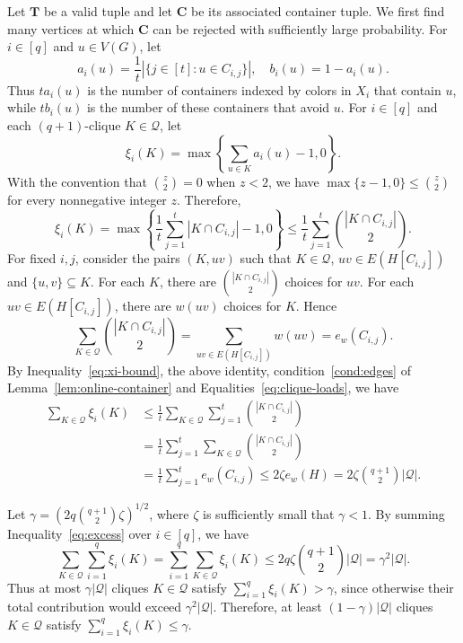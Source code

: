 \documentclass[12pt]{article}
\numberwithin{equation}{section}
\theoremstyle{definition}
\begin{document}
Let $\mathbf{T}$ be a valid tuple and let $\mathbf{C}$ be its associated
container tuple. We first find many vertices at which $\mathbf{C}$ can be
rejected with sufficiently large probability. For $i \in [q]$ and
$u \in V(G)$, let
\[
 a_i(u) = \frac{1}{t}|\{j \in [t] : u \in C_{i,j}\}|,
 \quad b_i(u) = 1 - a_i(u).
\]
Thus $ta_i(u)$ is the number of containers indexed by colors in $X_i$ that
contain $u$, while $tb_i(u)$ is the number of these containers that avoid $u$.
For $i\in[q]$ and each $(q+1)$-clique $K\in\mathcal Q$, let
\[
 \xi_i(K) = \max\left\{\sum_{u \in K} a_i(u) - 1,0\right\}.
\]
With the convention that $\binom{z}{2}=0$ when $z<2$, we have
$\max\{z-1,0\}\leq\binom{z}{2}$ for every nonnegative integer $z$. Therefore,
\begin{equation}\label{eq:xi-bound}
 \xi_i(K)
 = \max\left\{\frac{1}{t}\sum_{j = 1}^t |K \cap C_{i,j}| - 1,0\right\}
 \leq \frac{1}{t}\sum_{j = 1}^t \binom{|K \cap C_{i,j}|}{2}.
\end{equation}
For fixed $i,j$, consider the pairs $(K,uv)$ such that
$K \in \mathcal Q$, $uv \in E(H[C_{i,j}])$ and $\{u,v\} \subseteq K$.
For each $K$, there are $\binom{|K \cap C_{i,j}|}{2}$ choices for $uv$.
For each $uv \in E(H[C_{i,j}])$, there are $w(uv)$ choices for $K$. Hence
\[
\sum_{K\in\mathcal Q}\binom{|K\cap C_{i,j}|}{2}
=\sum_{uv\in E(H[C_{i,j}])}w(uv)
=e_w(C_{i,j}).
\] 
By Inequality~\eqref{eq:xi-bound}, the above identity,
condition~\ref{cond:edges} of Lemma~\ref{lem:online-container} and
Equalities~\eqref{eq:clique-loads}, we have
\begin{equation}\label{eq:excess}
 \begin{aligned}
 \sum_{K \in \mathcal Q} \xi_i(K)
 & \leq \frac{1}{t}\sum_{K \in \mathcal Q} \sum_{j = 1}^t
       \binom{|K \cap C_{i,j}|}{2}\\
 &= \frac{1}{t}\sum_{j = 1}^t \sum_{K \in \mathcal Q}
       \binom{|K \cap C_{i,j}|}{2}\\
 &= \frac{1}{t}\sum_{j = 1}^t e_w(C_{i,j})
 \leq 2\zeta e_w(H)
 = 2\zeta\binom{q + 1}{2}|\mathcal Q|.
 \end{aligned}
\end{equation}
 
Let $\gamma = (2q\binom{q + 1}{2}\zeta)^{1/2}$, where $\zeta$ is
sufficiently small that $\gamma < 1$. By summing Inequality~\eqref{eq:excess} over $i\in[q]$, we have
\[
\sum_{K\in\mathcal Q}\sum_{i=1}^q\xi_i(K)
=\sum_{i=1}^q\sum_{K\in\mathcal Q}\xi_i(K)
\leq 2q\zeta\binom{q+1}{2}|\mathcal Q|
=\gamma^2|\mathcal Q|.
\]
Thus at most $\gamma|\mathcal Q|$ cliques $K\in\mathcal Q$ satisfy
$\sum_{i=1}^q\xi_i(K)>\gamma$, since otherwise their total contribution
would exceed $\gamma^2|\mathcal Q|$. Therefore, at least
$(1-\gamma)|\mathcal Q|$ cliques $K\in\mathcal Q$ satisfy
$\sum_{i=1}^q\xi_i(K)\leq\gamma$.
  
\end{document}

